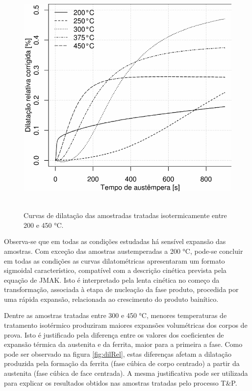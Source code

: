 \begin{figure}
	\includegraphics[height=12cm]{img/dilatometria/dilation_IBT.pdf}
	\caption{Curvas de dilatação das amostradas tratadas isotermicamente entre 200 e 450 °C.}
	\label{fig:IBT}
\end{figure}

Observa-se que em todas as condições estudadas há sensível expansão das amostras. Com exceção das amostras austemperadas a 200 °C, pode-se concluir em todas as condições as curvas dilatométricas apresentaram um formato sigmoidal característico, compatível com a descrição cinética prevista pela equação de JMAK. Isto é interpretado pela lenta cinética no começo da transformação, associada à etapa de nucleação da fase produto, procedida por uma rápida expansão, relacionada ao crescimento do produto bainítico.

Dentre as amostras tratadas entre 300 e 450 °C, menores temperaturas de tratamento isotérmico produziram maiores expansões volumétricas dos corpos de prova. Isto é justificado pela diferença entre os valores dos coeficientes de expansão térmica da austenita e da ferrita, maior para a primeira a fase. Como pode ser observado na figura \ref{fig:dilRel}, estas diferenças afetam a dilatação produzida pela formação da ferrita (fase cúbica de corpo centrado) a partir da austenita (fase cúbica de face centrada). A mesma justificativa pode ser utilizada para explicar os resultados obtidos nas amostras tratadas pelo processo T\&P.

